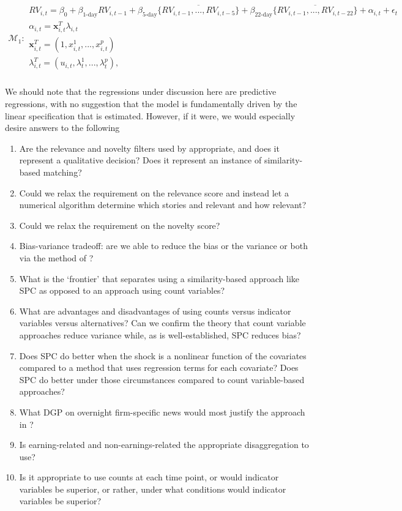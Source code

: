 \documentclass[11pt]{article}
\newcommand{\x}{\textbf{x}}
\def\mc#1{\mathcal{#1}} %
\def\mc#1{\mathcal{#1}}
\theoremstyle{definition}
\begin{document}
\begin{align}
  \mc{M}_1 \colon \begin{array}{l}
    RV_{i,t} = \beta_{0} + \beta_{\text{1-day}}RV_{i,t-1} + \beta_{\text{5-day}}\overline{\{RV_{i,t-1},...,RV_{i,t-5}\}}+\beta_{\text{22-day}}\overline{\{RV_{i,t-1},...,RV_{i,t-22}\}} + \alpha_{i,t} + \epsilon_{t}\\[.2cm]
    \alpha_{i,t} = \x^{T}_{i,t}\lambda_{i,t} \\[.2cm]
    \x_{i,t}^{T} = (1,x^{1}_{i,t},...,x^{p}_{i,t})\\[.2cm] 
    \lambda_{i,t}^{T} = (u_{i,t},\lambda^{1}_{t},...,\lambda^{p}_{t}),\\[.2cm]
  \end{array}
  \end{align}

We should note that the regressions under discussion here are predictive regressions, with no suggestion that the model is fundamentally driven by the linear specification that is estimated.  However, if it were, we would especially desire answers to the following

\begin{enumerate}
  \item Are the relevance and novelty filters used by \cite{bodilsen2023exploiting} appropriate, and does it represent a qualitative decision?  Does it represent an instance of similarity-based matching?
  \item Could we relax the requirement on the relevance score and instead let a numerical algorithm determine which stories and relevant and how relevant?
  \item Could we relax the requirement on the novelty score?
  \item Bias-variance tradeoff: are we able to reduce the bias or the variance or both via the method of \cite{bodilsen2023exploiting}?
  \item What is the `frontier' that separates using a similarity-based approach like SPC as opposed to an approach using count variables?
  \item What are advantages and disadvantages of using counts versus indicator variables versus alternatives?  Can we confirm the theory that count variable approaches reduce variance while, as is well-established, SPC reduces bias?
  \item Does SPC do better when the shock is a nonlinear function of the covariates compared to a method that uses regression terms for each covariate?  Does SPC do better under those circumstances compared to count variable-based approaches? 
  \item  What DGP on overnight firm-specific news would most justify the approach in \cite{bodilsen2023exploiting}?
  \item Is earning-related and non-earnings-related the appropriate disaggregation to use?
  \item Is it appropriate to use counts at each time point, or would indicator variables be superior, or rather, under what conditions would indicator variables be superior?

\end{enumerate}
\end{document}

